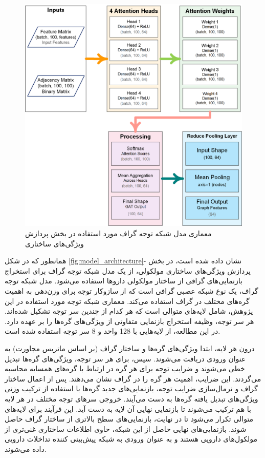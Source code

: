 \begin{figure}[t]
	\centering
	\includegraphics[width=\textwidth]{images/gat-model.png}
	\caption{معماری مدل شبکه توجه گراف مورد استفاده در بخش پردازش ویژگی‌های ساختاری}
	\label{fig:gat_model}
\end{figure}

همانطور که در شکل \ref{fig:model_architecture}- نشان داده شده است، در بخش پردازش ویژگی‌های ساختاری مولکولی، از یک مدل شبکه توجه گراف برای استخراج بازنمایی‌های گرافی از ساختار مولکولی داروها استفاده می‌شود. مدل شبکه توجه گراف، یک نوع شبکه عصبی گرافی است که از سازوکار توجه برای وزن‌دهی به اهمیت گره‌های مختلف در گراف استفاده می‌کند. معماری شبکه توجه مورد استفاده در این پژوهش، شامل لایه‌های متوالی است که هر کدام از چندین سر توجه تشکیل شده‌اند. هر سر توجه، وظیفه استخراج بازنمایی متفاوتی از ویژگی‌های گره‌ها را بر عهده دارد. در این مطالعه، از لایه‌هایی با 128 واحد و 8 سر توجه استفاده شده است.

درون هر لایه، ابتدا ویژگی‌های گره‌ها و ساختار گراف (بر اساس ماتریس مجاورت) به عنوان ورودی دریافت می‌شوند. سپس، برای هر سر توجه، ویژگی‌های گره‌ها تبدیل خطی می‌شوند و ضرایب توجه برای هر گره در ارتباط با گره‌های همسایه محاسبه می‌گردند. این ضرایب، اهمیت هر گره را در گراف نشان می‌دهند. پس از اعمال ساختار گراف و نرمال‌سازی ضرایب توجه، بازنمایی‌های جدید گره‌ها با استفاده از ترکیب وزنی ویژگی‌های تبدیل یافته گره‌ها به دست می‌آیند. خروجی سرهای توجه مختلف در هر لایه با هم ترکیب می‌شوند تا بازنمایی نهایی آن لایه به دست آید. این فرآیند برای لایه‌های متوالی تکرار می‌شود تا در نهایت، بازنمایی‌های سطح بالاتری از ساختار گراف حاصل شوند. بازنمایی‌های نهایی حاصل از این شبکه، حاوی اطلاعات ساختاری غنی‌تری از مولکول‌های دارویی هستند و به عنوان ورودی به شبکه پیش‌بینی کننده تداخلات دارویی داده می‌شوند. 


